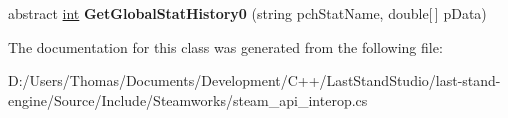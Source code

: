 \begin{DoxyCompactItemize}
\item 
\hypertarget{classValve_1_1Steamworks_1_1ISteamUserStats_a1d2c573695c943efd033230097db83bc}{}abstract \hyperlink{SDL__thread_8h_a6a64f9be4433e4de6e2f2f548cf3c08e}{int} {\bfseries Get\+Global\+Stat\+History0} (string pch\+Stat\+Name, double\mbox{[}$\,$\mbox{]} p\+Data)\label{classValve_1_1Steamworks_1_1ISteamUserStats_a1d2c573695c943efd033230097db83bc}

\end{DoxyCompactItemize}


The documentation for this class was generated from the following file\+:\begin{DoxyCompactItemize}
\item 
D\+:/\+Users/\+Thomas/\+Documents/\+Development/\+C++/\+Last\+Stand\+Studio/last-\/stand-\/engine/\+Source/\+Include/\+Steamworks/steam\+\_\+api\+\_\+interop.\+cs\end{DoxyCompactItemize}
